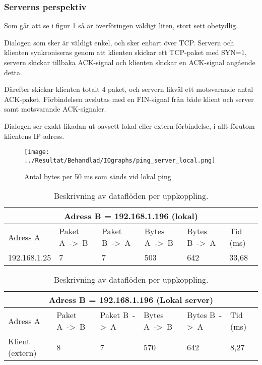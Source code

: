 \documentclass[journal,comsoc]{IEEEtran}
\begin{document}
\subsubsection{Serverns perspektiv}
Som går att se i figur \ref{fig:server:localping} så är överföringen väldigt liten, stort sett obetydlig.

Dialogen som sker är väldigt enkel, och sker enbart över TCP. Servern och klienten synkroniseras genom att klienten skickar ett TCP-paket med SYN=1, servern skickar tillbaka ACK-signal och klienten skickar en ACK-signal angående detta. 

Därefter skickar klienten totalt 4 paket, och servern likväl ett motsvarande antal ACK-paket. Förbindelsen avslutas med en FIN-signal från både klient och server samt motsvarande ACK-signaler.

Dialogen ser exakt likadan ut oavsett lokal eller extern förbindelse, i allt förutom klientens IP-adress.

\begin{figure} [H]
  \centering
  \texttt{[image: ../Resultat/Behandlad/IOgraphs/ping\_server\_local.png]}
  \caption{Antal bytes per 50 ms som sänds vid lokal ping}
  \label{fig:server:localping}
\end{figure}
\begin{table} [H]
  \begin{center}
    \label{table:server:localping}
    \begin{tabular}{ | m{1.5cm} |  m{1cm} | m{1cm}| m{1cm}|m{1cm}|m{0.5cm}| } 
      \hline
      \multicolumn{6}{|c|}{Adress B = 192.168.1.196 (lokal)} \\
      \hline
      Adress A & Paket A~->~B & Paket B~->~A & Bytes A~->~B & Bytes B~->~A & Tid (ms) \\
      \hline
      192.168.1.25 & 7 & 7 & 503 & 642 & 33,68 \\
      \hline   
    \end{tabular}
  \end{center}
  \caption{Beskrivning av dataflöden per uppkoppling.}
\end{table}
\begin{table} [H]
  \begin{center}
    \label{table:server:externping}
    \begin{tabular}{ | m{1.5cm} |  m{1cm} | m{1cm}| m{1cm}|m{1cm}|m{0.5cm}| } 
      \hline
      \multicolumn{6}{|c|}{Adress B = 192.168.1.196 (Lokal server)} \\
      \hline
      Adress A & Paket A~->~B & Paket B~->~A & Bytes A~->~B & Bytes B~->~A & Tid (ms) \\
      \hline
      Klient (extern) & 8 & 7 & 570 & 642 & 8,27 \\
      \hline   
    \end{tabular}
  \end{center}
  \caption{Beskrivning av dataflöden per uppkoppling.}
\end{table}
\end{document}
